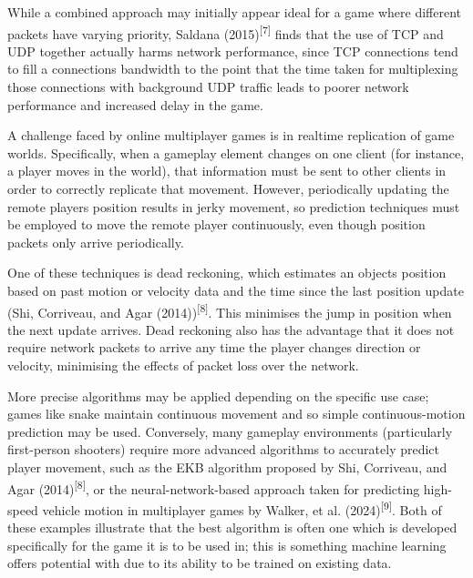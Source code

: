 \documentclass[
]{article}
\begin{document}
While a combined approach may initially appear ideal for a game where
different packets have varying priority, Saldana
(2015)\textsuperscript{{[}7{]}} finds that the use of TCP and UDP
together actually harms network performance, since TCP connections tend
to fill a connection\textquotesingle s bandwidth to the point that the
time taken for multiplexing those connections with background UDP
traffic leads to poorer network performance and increased delay in the
game.

A challenge faced by online multiplayer games is in realtime replication
of game worlds. Specifically, when a gameplay element changes on one
client (for instance, a player moves in the world), that information
must be sent to other clients in order to correctly replicate that
movement. However, periodically updating the remote
player\textquotesingle s position results in jerky movement, so
prediction techniques must be employed to move the remote player
continuously, even though position packets only arrive periodically.

One of these techniques is dead reckoning, which estimates an objects
position based on past motion or velocity data and the time since the
last position update (Shi, Corriveau, and Agar
(2014))\textsuperscript{{[}8{]}}. This minimises the jump in position
when the next update arrives. Dead reckoning also has the advantage that
it does not require network packets to arrive any time the player
changes direction or velocity, minimising the effects of packet loss
over the network.

More precise algorithms may be applied depending on the specific use
case; games like snake maintain continuous movement and so simple
continuous-motion prediction may be used. Conversely, many gameplay
environments (particularly first-person shooters) require more advanced
algorithms to accurately predict player movement, such as the
\textquotesingle EKB\textquotesingle{} algorithm proposed by Shi,
Corriveau, and Agar (2014)\textsuperscript{{[}8{]}}, or the
neural-network-based approach taken for predicting high-speed vehicle
motion in multiplayer games by Walker, et al.
(2024)\textsuperscript{{[}9{]}}. Both of these examples illustrate that
the best algorithm is often one which is developed specifically for the
game it is to be used in; this is something machine learning offers
potential with due to its ability to be trained on existing data.
\end{document}
